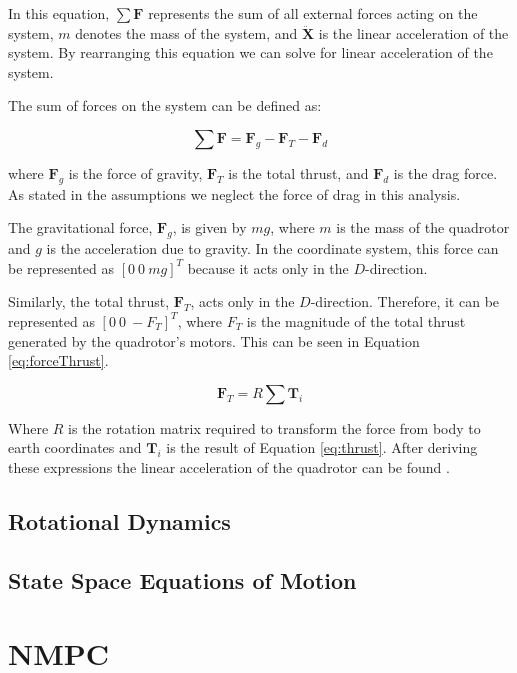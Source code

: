 \documentclass{UoNMCHA}
\numberwithin{equation}{section}
\begin{document}
In this equation, \(\sum \mathbf{F}\) represents the sum of all external forces acting on the system, \(m\) denotes the mass of the system, and \(\mathbf{\ddot{X}}\) is the linear acceleration of the system. By rearranging this equation we can solve for linear acceleration of the system.

The sum of forces on the system can be defined as:

\begin{equation}
\sum \mathbf{F} = \mathbf{F}_g - \mathbf{F}_T - \mathbf{F}_d
\label{eq:sum_of_forces}
\end{equation}

where \(\mathbf{F}_g\) is the force of gravity, \(\mathbf{F}_T\) is the total thrust, and \(\mathbf{F}_d\) is the drag force. As stated in the assumptions we neglect the force of drag in this analysis.

The gravitational force, \(\mathbf{F}_g\), is given by \(mg\), where \(m\) is the mass of the quadrotor and \(g\) is the acceleration due to gravity. In the coordinate system, this force can be represented as \([0 \ 0 \ mg]^T\) because it acts only in the \(D\)-direction.

Similarly, the total thrust, \(\mathbf{F}_T\), acts only in the \(D\)-direction. Therefore, it can be represented as \([0 \ 0 \ -F_T]^T\), where \(F_T\) is the magnitude of the total thrust generated by the quadrotor's motors. This can be seen in Equation \ref{eq:forceThrust}.


\begin{equation}
    \mathbf{F}_T = R \sum \mathbf{T}_i
    \label{eq:forceThrust}
    \end{equation}

Where \( R \) is the rotation matrix required to transform the force from body to earth coordinates and \( \mathbf{T}_i \) is the result of Equation \ref{eq:thrust}.
After deriving these expressions the linear acceleration of the quadrotor can be found \cite{website:Quadrotorsystemmodeling}.

\subsection{Rotational Dynamics}

\subsection{State Space Equations of Motion}

\section{NMPC}
\end{document}
